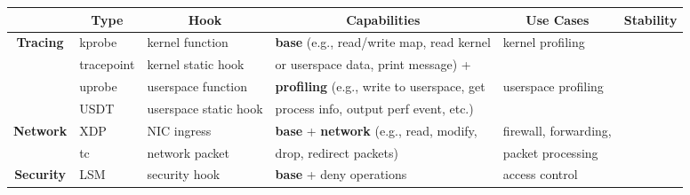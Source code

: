\begin{table*}[t]
  \newcommand{\thead}[1]{\multicolumn{1}{|c}{\bfseries #1}}
  \newcommand{\stari}{\raisebox{-0.25em}{\FiveStar\FiveStarOpen\FiveStarOpen\FiveStarOpen\FiveStarOpen}}
  \newcommand{\starii}{\raisebox{-0.25em}{\FiveStar\FiveStar\FiveStarOpen\FiveStarOpen\FiveStarOpen}}
  \newcommand{\stariii}{\raisebox{-0.25em}{\FiveStar\FiveStar\FiveStar\FiveStarOpen\FiveStarOpen}}
  \newcommand{\stariv}{\raisebox{-0.25em}{\FiveStar\FiveStar\FiveStar\FiveStar\FiveStarOpen}}

  \setlength{\tabcolsep}{4.5pt}

  \centering
  \begin{tabular}{c||l|l|l|l|l}
     & \thead{Type}   & \thead{Hook}          & \thead{Capabilities}                                  & \thead{Use Cases}                    & \thead{Stability} \\ \hline \hline

    \multirow{4}{*}{\textbf{Tracing}}
     & kprobe         & kernel function       & \textbf{base} (e.g., read/write map, read kernel      & \multirow{2}{*}{kernel profiling}    & \stari            \\ \cline{2-3} \cline{6-6}
     & tracepoint     & kernel static hook    & \quad  or userspace data, print message) +            &                                      & \starii           \\ \cline{2-3} \cline{5-6}
     & uprobe         & userspace function    & \textbf{profiling} (e.g., write to userspace, get     & \multirow{2}{*}{userspace profiling} & \stari            \\ \cline{2-3} \cline{6-6}
     & USDT           & userspace static hook & \quad process info, output perf event, etc.)          &                                      & \starii           \\ \hline


    \multirow{2}{*}{\textbf{Network}}
     & XDP            & NIC ingress           & \textbf{base} + \textbf{network} (e.g., read, modify, & firewall, forwarding,                & \stariv           \\ \cline{2-3} \cline{6-6}
     & tc             & network packet        & drop, redirect packets)                               & packet processing                    & \stariv           \\ \hline

    \multirow{1}{*}{\textbf{Security}}
     & LSM            & security hook         & \textbf{base} + deny operations                       & access control                       & \stariii          \\ \hline


\end{tabular}
\end{table*}
